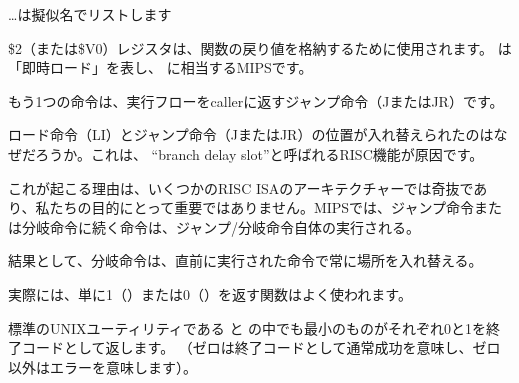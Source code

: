 \dots \IDA は擬似名でリストします



\$2（または\$V0）レジスタは、関数の戻り値を格納するために使用されます。 
は「即時ロード」を表し、 \MOV に相当するMIPSです。

もう1つの命令は、実行フローを\gls{caller}に返すジャンプ命令（JまたはJR）です。

ロード命令（LI）とジャンプ命令（JまたはJR）の位置が入れ替えられたのはなぜだろうか。これは、 ``branch delay slot''と呼ばれる\ac{RISC}機能が原因です。

これが起こる理由は、いくつかのRISC \ac{ISA}のアーキテクチャーでは奇抜であり、私たちの目的にとって重要ではありません。MIPSでは、ジャンプ命令または分岐命令に続く命令は、ジャンプ/分岐命令自体の実行される。

結果として、分岐命令は、直前に実行された命令で常に場所を入れ替える。

実際には、単に1（）または0（）を返す関数はよく使われます。

標準のUNIXユーティリティである と の中でも最小のものがそれぞれ0と1を終了コードとして返します。
（ゼロは終了コードとして通常成功を意味し、ゼロ以外はエラーを意味します）。

